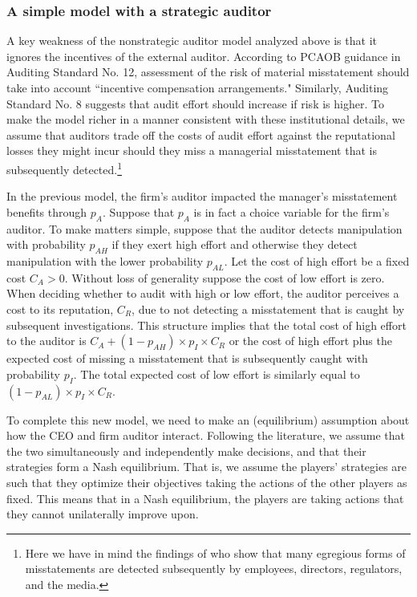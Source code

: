 \subsubsection{A simple model with a strategic auditor}
A key weakness of the nonstrategic auditor model analyzed above is that it ignores the incentives of the  external auditor.
According to PCAOB guidance in Auditing Standard No. 12, assessment of the risk of material misstatement should take into account ``incentive compensation arrangements."
Similarly, Auditing Standard No. 8 suggests that audit effort should increase if risk is higher.
To make the model richer in a manner consistent with these institutional details, we assume that auditors trade off the costs of audit effort against the reputational losses they might incur should they miss a managerial misstatement that is subsequently detected.\footnote{
Here we have in mind the findings of \citet{Dyck:2010kh} who show that many egregious forms of misstatements are detected subsequently by employees, directors, regulators, and the media.} 

In the previous model, the firm's auditor impacted the manager's misstatement benefits through $p_A$. 
Suppose that $p_A$ is in fact a choice variable for the firm's auditor. 
To make matters simple, suppose that the auditor detects manipulation with probability $p_{AH}$ if they exert high effort and  otherwise they detect manipulation with the lower probability $p_{AL}$. 
Let the cost of high effort be a fixed cost $C_A > 0$. 
Without loss of generality suppose the cost of low effort is zero. 
When deciding whether to audit with high or low effort, the auditor perceives a cost to its reputation, $C_R$, due to not detecting a misstatement that is caught by subsequent investigations. 
This structure implies that the total cost of high effort to the auditor is $C_A + (1-p_{AH}) \times p_I \times C_R$ or the cost of high effort plus the expected cost of missing a misstatement that is subsequently caught with probability $p_I$. 
The total expected cost of
low effort is similarly equal to $(1-p_{AL}) \times p_I \times C_R$. 

To complete this new model, we need to make an (equilibrium) assumption about how the CEO and firm auditor interact. 
Following the literature, we assume that the two simultaneously and independently make decisions, and that their strategies form a Nash equilibrium.
That is, we assume the players' strategies are such that they optimize their objectives  taking the actions of the other players as fixed. This means that in a Nash equilibrium, the players are taking actions that they cannot unilaterally improve upon.

